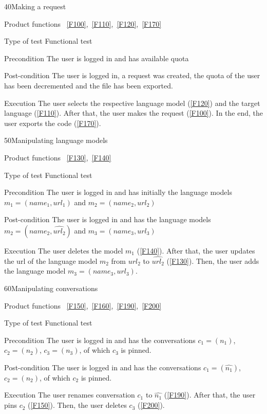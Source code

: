 \begin{testcase}{40}{Making a request}
  \item[Product functions]~\ref{F100},~\ref{F110},~\ref{F120},~\ref{F170}
  \item[Type of test] Functional test
  \item[Precondition] The user is logged in and has available quota
  \item[Post-condition] The user is logged in, a request was created, the quota of the user has been decremented and the file has been exported.
  \item[Execution] The user selects the respective language model (\ref{F120}) and the target language (\ref{F110}).
    After that, the user makes the request (\ref{F100}). In the end, the user exports the code (\ref{F170}).
\end{testcase}

\begin{testcase}{50}{Manipulating language models}
  \item[Product functions]~\ref{F130},~\ref{F140}
  \item[Type of test] Functional test
  \item[Precondition] The user is logged in and has initially the language models $m_1 = (name_1, url_1)$ and $m_2 = (name_2, url_2)$
  \item[Post-condition] The user is logged in and has the language models $m_2 = (name_2, \hat{url_2})$ and $m_3 = (name_3, url_3)$
  \item[Execution] The user deletes the model $m_1$ (\ref{F140}).
    After that, the user updates the url of the language model $m_2$ from $url_2$ to $\hat{url_2}$ (\ref{F130}).
    Then, the user adds the language model $m_3 = (name_3, url_3)$.
\end{testcase}

\begin{testcase}{60}{Manipulating conversations}
  \item[Product functions]~\ref{F150},~\ref{F160},~\ref{F190},~\ref{F200}
  \item[Type of test] Functional test
  \item[Precondition] The user is logged in and has the conversations $c_1 = (n_1)$, $c_2 = (n_2)$, $c_3 = (n_3)$, of which $c_3$ is pinned.
  \item[Post-condition] The user is logged in and has the conversations $c_1 = (\hat{n_1})$, $c_2 = (n_2)$, of which $c_2$ is pinned.
  \item[Execution] The user renames conversation $c_1$ to $\hat{n_1}$ (\ref{F190}).
    After that, the user pins $c_2$ (\ref{F150}).
    Then, the user deletes $c_3$ (\ref{F200}).
\end{testcase}

